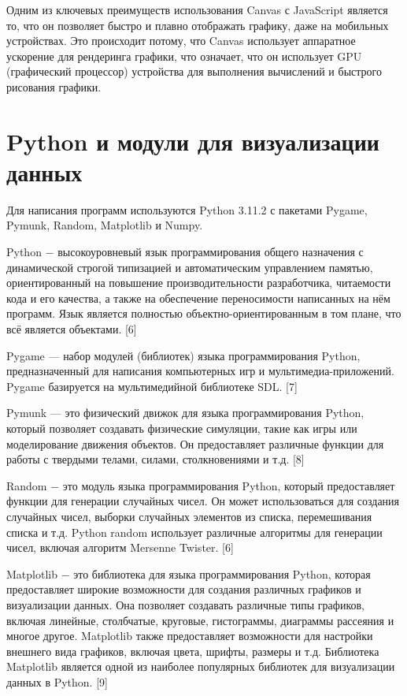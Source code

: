 Одним из ключевых преимуществ использования Canvas с JavaScript является то, что он позволяет быстро и плавно отображать графику, даже на мобильных устройствах. Это происходит потому, что Canvas использует аппаратное ускорение для рендеринга графики, что означает, что он использует GPU (графический процессор) устройства для выполнения вычислений и быстрого рисования графики.

\section{Python и модули для визуализации данных}

Для написания программ используются Python 3.11.2 с пакетами Pygame, Pymunk, Random, Matplotlib и Numpy.

Python $-$ высокоуровневый язык программирования общего назначения с динамической строгой типизацией и автоматическим управлением памятью, ориентированный на повышение производительности разработчика, читаемости кода и его качества, а также на обеспечение переносимости написанных на нём программ. Язык является полностью объектно-ориентированным в том плане, что всё является объектами. [6]

Pygame — набор модулей (библиотек) языка программирования Python, предназначенный для написания компьютерных игр и мультимедиа-приложений. Pygame базируется на мультимедийной библиотеке SDL. [7]

Pymunk — это физический движок для языка программирования Python, который позволяет создавать физические симуляции, такие как игры или моделирование движения объектов. Он предоставляет различные функции для работы с твердыми телами, силами, столкновениями и т.д. [8]

Random $-$ это модуль языка программирования Python, который предоставляет функции для генерации случайных чисел. Он может использоваться для создания случайных чисел, выборки случайных элементов из списка, перемешивания списка и т.д. Python random использует различные алгоритмы для генерации чисел, включая алгоритм Mersenne Twister. [6]

Matplotlib $-$ это библиотека для языка программирования Python, которая предоставляет широкие возможности для создания различных графиков и визуализации данных. Она позволяет создавать различные типы графиков, включая линейные, столбчатые, круговые, гистограммы, диаграммы рассеяния и многое другое. Matplotlib также предоставляет возможности для настройки внешнего вида графиков, включая цвета, шрифты, размеры и т.д. Библиотека Matplotlib является одной из наиболее популярных библиотек для визуализации данных в Python. [9]

